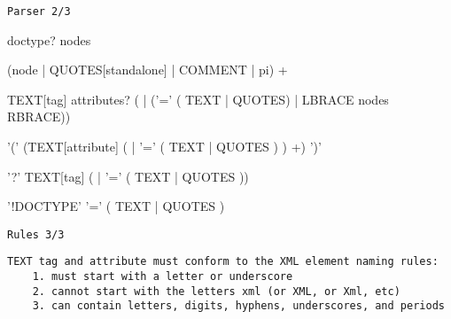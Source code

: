 \documentclass[10pt,a4paper]{article}
\begin{document}
\pagebreak

\texttt{Parser \hfill 2/3}

\vspace{2mm}

\raisebox{8pt}{xmq:}
\begin{minipage}{15cm}
\begin{rail}
  doctype? nodes
\end{rail}
\end{minipage}

\raisebox{45pt}{nodes:}
\begin{minipage}{15cm}
\begin{rail}
  (node | QUOTES[standalone] | COMMENT | pi) +
\end{rail}
\end{minipage}

\raisebox{33pt}{node:}
\begin{minipage}{15cm}
\begin{rail}
  TEXT[tag] attributes? ( | ('=' ( TEXT | QUOTES) | LBRACE nodes RBRACE))
\end{rail}
\end{minipage}

\raisebox{32pt}{attributes:}
\begin{minipage}{15cm}
\begin{rail}
'(' (TEXT[attribute] ( | '=' ( TEXT | QUOTES ) ) +) ')'
\end{rail}
\end{minipage}

\raisebox{20pt}{pi:}
\begin{minipage}{15cm}
\begin{rail}
'?' TEXT[tag] ( | '=' ( TEXT | QUOTES ))
\end{rail}
\end{minipage}

\raisebox{8pt}{doctype:}
\begin{minipage}{15cm}
\begin{rail}
'!DOCTYPE' '=' ( TEXT | QUOTES )
\end{rail}
\end{minipage}

\pagebreak

\texttt{Rules \hfill 3/3}

\vspace{5mm}

\verb|TEXT tag and attribute must conform to the XML element naming rules:|\\
\verb|    1. must start with a letter or underscore| \\
\verb|    2. cannot start with the letters xml (or XML, or Xml, etc)| \\
\verb|    3. can contain letters, digits, hyphens, underscores, and periods|
\end{document}
